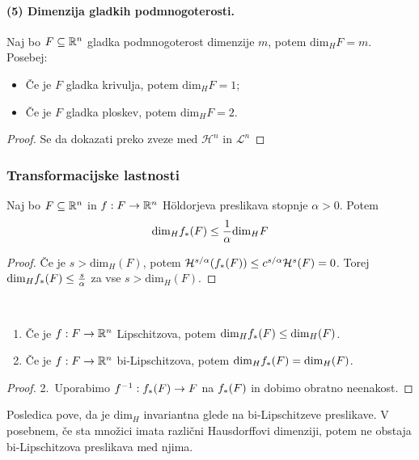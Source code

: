 \paragraph{(5) Dimenzija gladkih podmnogoterosti.} Naj bo \(F \subseteq \mathbb{R}^n\) gladka podmnogoterost dimenzije \(m\), potem \(\text{dim}_H F = m\). Posebej:
\begin{itemize}
    \item Če je \(F\) gladka krivulja, potem \(\text{dim}_H F = 1\);
    \item Če je \(F\) gladka ploskev, potem \(\text{dim}_H F = 2\).
\end{itemize}

\begin{proof}
    Se da dokazati preko zveze med \(\mathcal{H}^{n}\) in \(\mathcal{L}^{n}\)
\end{proof}

\subsubsection*{Transformacijske lastnosti}
\begin{trditev}
    Naj bo \(F \subseteq \mathbb{R}^n\) in \(f: F \to \mathbb{R}^n\) Höldorjeva preslikava stopnje \(\alpha > 0\). Potem 
    \[\text{dim}_H f_{*}(F) \leq \frac{1}{\alpha} \text{dim}_H F\]
\end{trditev}
\begin{proof}
    Če je \(s > \text{dim}_H(F)\), potem \(\mathcal{H}^{s/\alpha} (f_{*}(F)) \leq c^{s/ \alpha} \mathcal{H}^{s}(F) = 0\). Torej \(\text{dim}_H f_{*}(F) \leq \frac{s}{\alpha}\) za vse \(s > \text{dim}_H(F)\).
\end{proof}

\begin{posledica}
    \ 
    \begin{enumerate}
        \item Če je \(f: F \to \mathbb{R}^n\) Lipschitzova, potem \(\text{dim}_H f_{*}(F) \leq \text{dim}_H(F)\).
        \item Če je \(f: F \to \mathbb{R}^n\) bi-Lipschitzova, potem \(\text{dim}_H f_{*}(F) = \text{dim}_H(F)\).
    \end{enumerate}
\end{posledica}

\begin{proof}
    2.\ Uporabimo \(f^{-1}: f_{*}(F) \to F\) na \(f_{*}(F)\) in dobimo obratno neenakost.
\end{proof}

Posledica pove, da je \(\text{dim}_H\) invariantna glede na bi-Lipschitzeve preslikave. V posebnem, če sta množici imata različni Hausdorffovi dimenziji, potem ne obstaja bi-Lipschitzova preslikava med njima.

